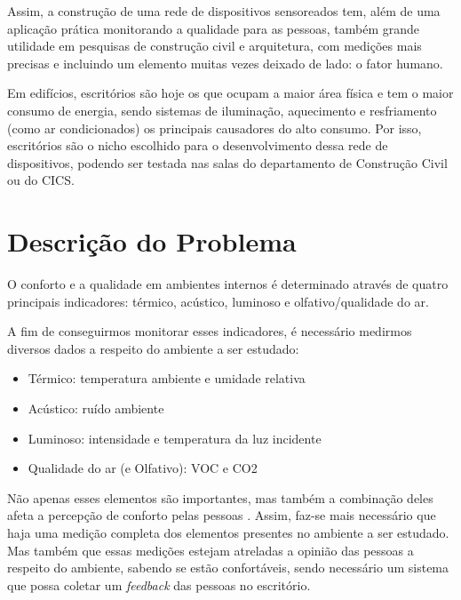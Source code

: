 \documentclass[]{politex}
\begin{document}
Assim, a construção de uma rede de dispositivos sensoreados tem, além de uma aplicação prática monitorando a qualidade para as pessoas, também grande utilidade em pesquisas de construção civil e arquitetura, com medições mais precisas e incluindo um elemento muitas vezes deixado de lado: o fator humano. 

Em edifícios, escritórios são hoje os que ocupam a maior área física e tem o maior consumo de energia, sendo sistemas de iluminação, aquecimento e resfriamento (como ar condicionados) os principais causadores do alto consumo\cite{EnergyBuildings}. Por isso, escritórios são o nicho escolhido para o desenvolvimento dessa rede de dispositivos, podendo ser testada nas salas do departamento de Construção Civil ou do CICS. 



\chapter{Descrição do Problema}


O conforto e a qualidade em ambientes internos é determinado através de quatro principais indicadores: térmico, acústico, luminoso e olfativo/qualidade do ar\cite{ComfortBox}. 

A fim de conseguirmos monitorar esses indicadores, é necessário medirmos diversos dados a respeito do ambiente a ser estudado: %
\begin{itemize}
\item Térmico: temperatura ambiente e umidade relativa
\item Acústico: ruído ambiente
\item Luminoso: intensidade e temperatura da luz incidente
\item Qualidade do ar (e Olfativo): VOC e CO2
\end{itemize}

Não apenas esses elementos são importantes, mas também a combinação deles afeta a percepção de conforto pelas pessoas \cite{ComfortOffice}. Assim, faz-se mais necessário que haja uma medição completa dos elementos presentes no ambiente a ser estudado. Mas também que essas medições estejam atreladas a opinião das pessoas a respeito do ambiente, sabendo se estão confortáveis, sendo necessário um sistema que possa coletar um \textit{feedback} das pessoas no escritório. 
\end{document}
